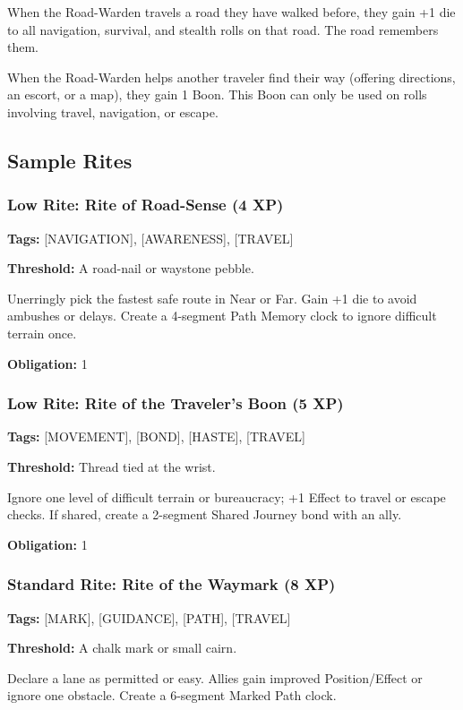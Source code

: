 When the Road-Warden travels a road they have walked before, they gain +1 die to all navigation, survival, and stealth rolls on that road. The road remembers them.

When the Road-Warden helps another traveler find their way (offering directions, an escort, or a map), they gain 1 Boon. This Boon can only be used on rolls involving travel, navigation, or escape.

\subsection{Sample Rites}

\subsubsection{Low Rite: Rite of Road-Sense (4 XP)}

\textbf{Tags:} [NAVIGATION], [AWARENESS], [TRAVEL]

\textbf{Threshold:} A road-nail or waystone pebble.

Unerringly pick the fastest safe route in Near or Far. Gain +1 die to avoid ambushes or delays. Create a 4-segment Path Memory clock to ignore difficult terrain once.

\textbf{Obligation:} 1

\subsubsection{Low Rite: Rite of the Traveler's Boon (5 XP)}

\textbf{Tags:} [MOVEMENT], [BOND], [HASTE], [TRAVEL]

\textbf{Threshold:} Thread tied at the wrist.

Ignore one level of difficult terrain or bureaucracy; +1 Effect to travel or escape checks. If shared, create a 2-segment Shared Journey bond with an ally.

\textbf{Obligation:} 1

\subsubsection{Standard Rite: Rite of the Waymark (8 XP)}

\textbf{Tags:} [MARK], [GUIDANCE], [PATH], [TRAVEL]

\textbf{Threshold:} A chalk mark or small cairn.

Declare a lane as permitted or easy. Allies gain improved Position/Effect or ignore one obstacle. Create a 6-segment Marked Path clock.

